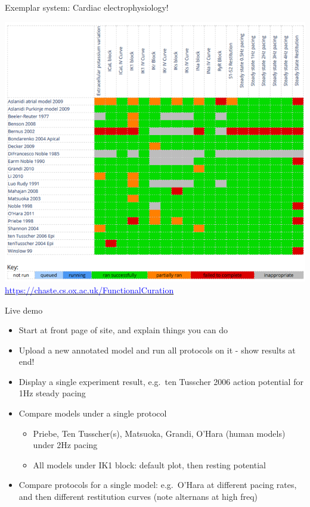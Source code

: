 \documentclass[t,xcolor={usenames,dvipsnames}]{beamer}
\newcommand{\myhref}[2]{\href{#1}{\textcolor{Blue}{#2}}}
\newcommand{\myurl}[1]{\myhref{#1}{#1}}
\begin{document}
\begin{frame}{Exemplar system: Cardiac electrophysiology!}
\begin{center}
\vspace{-.5cm}
\includegraphics[height=.8\textheight]{cardiac_fc_matrix}\\
\myurl{https://chaste.cs.ox.ac.uk/FunctionalCuration}
\end{center}
\end{frame}


\begin{frame}{Live demo}
\begin{itemize}
\item Start at front page of site, and explain things you can do
\item Upload a new annotated model and run all protocols on it - show results at end!
\item Display a single experiment result, e.g.\ ten Tusscher 2006 action potential for 1Hz steady pacing
\item Compare models under a single protocol
  \begin{itemize}
  \item Priebe, Ten Tusscher(s), Matsuoka, Grandi, O'Hara (human models) under 2Hz pacing
  \item All models under IK1 block: default plot, then resting potential
  \end{itemize}
\item Compare protocols for a single model: e.g.\ O'Hara at different pacing rates, and then different restitution curves (note alternans at high freq)
\end{itemize}
\end{frame}
\end{document}
